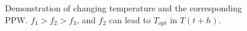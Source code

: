 \begin{figure}[htb]
{\begin{minipage}{.3\linewidth}
\end{minipage}
}
\caption{Demonstration of changing temperature and the corresponding PPW. $f_{1}>f_{2}>f_{3}$, and $f_{2}$ can lead to $T_{opt}$ in $T(t+h)$.}
\label{fig:ppw_boost}
\end{figure}

